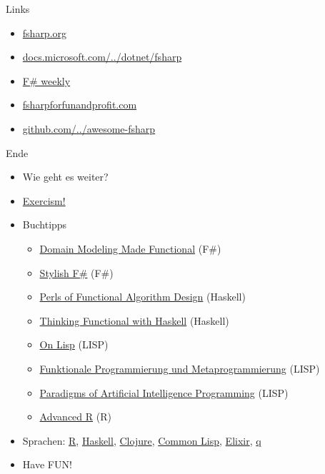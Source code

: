 \documentclass[t]{beamer}
\begin{document}
\begin{frame}[label={sec:org36aba8b}]{Links}
\begin{itemize}
\item \href{https://fsharp.org/}{fsharp.org}
\item \href{https://docs.microsoft.com/de-de/dotnet/fsharp/}{docs.microsoft.com/../dotnet/fsharp}
\item \href{https://sergeytihon.com/}{F\# weekly}
\item \href{https://fsharpforfunandprofit.com/}{fsharpforfunandprofit.com}
\item \href{https://github.com/fsprojects/awesome-fsharp}{github.com/../awesome-fsharp}
\end{itemize}
\end{frame}

\begin{frame}[label={sec:org5528b6b}]{Ende}
\begin{itemize}
\item Wie geht es weiter?
\item \href{https://exercism.io}{Exercism!}
\item Buchtipps
\begin{itemize}
\item \href{https://pragprog.com/book/swdddf/domain-modeling-made-functional}{Domain Modeling Made Functional} (F\#)
\item \href{https://www.apress.com/gp/book/9781484239995}{Stylish F\#} (F\#)
\item \href{https://www.cambridge.org/core/books/pearls-of-functional-algorithm-design/B0CF0AC5A205AF9491298684113B088F\#}{Perls of Functional Algorithm Design} (Haskell)
\item \href{https://www.cs.ox.ac.uk/publications/books/functional/}{Thinking Functional with Haskell} (Haskell)
\item \href{http://www.paulgraham.com/onlisp.html}{On Lisp} (LISP)
\item \href{http://www.iqool.de/FPMP.html}{Funktionale Programmierung und Metaprogrammierung} (LISP)
\item \href{https://github.com/norvig/paip-lisp}{Paradigms of Artificial Intelligence Programming} (LISP)
\item \href{https://adv-r.hadley.nz/}{Advanced R} (R)
\end{itemize}
\item Sprachen: \href{https://www.r-project.org/}{R}, \href{https://www.haskell.org/}{Haskell}, \href{https://clojure.org/}{Clojure}, \href{https://lisp-lang.org/}{Common Lisp}, \href{https://elixir-lang.org/}{Elixir}, \href{https://code.kx.com/q/}{q}

\item \alert{\alert{Have FUN!}}
\end{itemize}
\end{frame}
\end{document}

